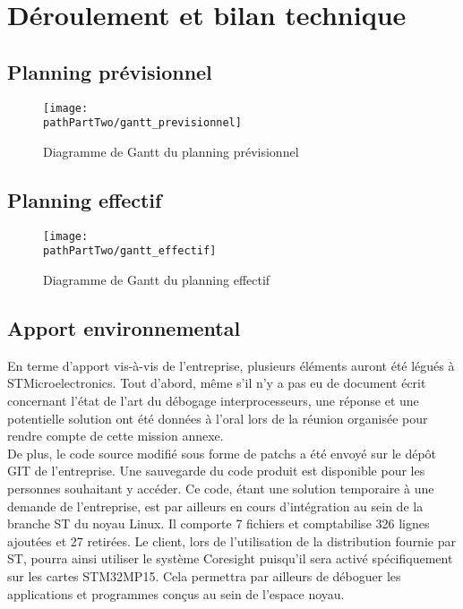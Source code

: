 
\section{Déroulement et bilan technique}

\subsection{Planning prévisionnel}

\begin{figure}[H]
	\begin{center}
		\texttt{[image: \\pathPartTwo/gantt\_previsionnel]}
		\caption{Diagramme de Gantt du planning prévisionnel}
	    \label{fig:gantt_previsionnel}
	\end{center}
\end{figure}

\subsection{Planning effectif}

\begin{figure}[H]
	\begin{center}
		\texttt{[image: \\pathPartTwo/gantt\_effectif]}
		\caption{Diagramme de Gantt du planning effectif}
	    \label{fig:gantt_effectif}
	\end{center}
\end{figure}

\subsection{Apport environnemental}
\label{sec:environmental_benefits}

En terme d'apport vis-à-vis de l'entreprise, plusieurs éléments auront été
légués à STMicroelectronics. Tout d'abord, même s'il n'y a pas eu de
document écrit concernant l'état de l'art du débogage interprocesseurs,
une réponse et une potentielle solution ont été données à l'oral lors de la
réunion organisée pour rendre compte de cette mission annexe. \\

De plus, le code source modifié sous forme de patchs a été envoyé sur le dépôt
GIT de l'entreprise. Une sauvegarde du code produit est disponible pour les
personnes souhaitant y accéder. Ce code, étant une solution temporaire à une
demande de l'entreprise, est par ailleurs en cours d'intégration au sein de la
branche ST du noyau Linux. Il comporte 7 fichiers et comptabilise 326 lignes
ajoutées et 27 retirées.  Le client, lors de l'utilisation de la distribution
fournie par ST, pourra ainsi utiliser le système Coresight puisqu'il sera
activé spécifiquement sur les cartes STM32MP15. Cela permettra par ailleurs de
déboguer les applications et programmes conçus au sein de l'espace noyau. \\

